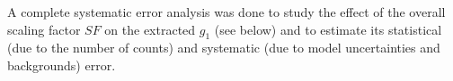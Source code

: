 A complete systematic error analysis was done to study the effect of the overall scaling factor $SF$ %
on the extracted $g_1$ (see below) and to estimate its statistical (due to the number of counts) and systematic (due to model uncertainties and backgrounds) error. 

